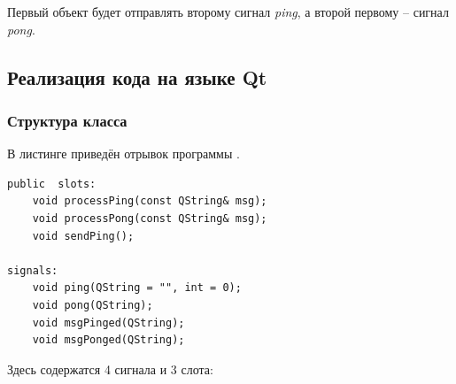 \documentclass[../AISTR.tex]{subfiles}
\begin{document}
Первый объект будет отправлять второму сигнал \textit{ping}, а второй первому -- сигнал \textit{pong}.
\subsection{Реализация кода на языке Qt}
\subsubsection{Структура класса}
В листинге  приведён отрывок программы \pp. 
\begin{lstlisting}[caption=Сигналы и слоты класса,captionpos=b, label={list:sig_slot}]
public  slots:
	void processPing(const QString& msg);
	void processPong(const QString& msg);
	void sendPing();
	
signals:
	void ping(QString = "", int = 0);
	void pong(QString);
	void msgPinged(QString);
	void msgPonged(QString);
\end{lstlisting}	
Здесь содержатся 4 сигнала и 3 слота:
\end{document}
